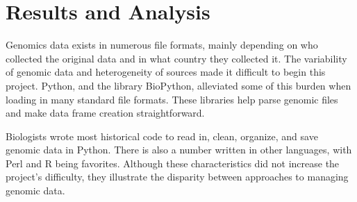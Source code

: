 \documentclass[]{article}
\begin{document}
\section{Results and Analysis}
Genomics data exists in numerous file formats, mainly depending on who collected the original data and in what country they collected it. The variability of genomic data and heterogeneity of sources made it difficult to begin this project. Python, and the library BioPython, alleviated some of this burden when loading in many standard file formats. These libraries help parse genomic files and make data frame creation straightforward.


Biologists wrote most historical code to read in, clean, organize, and save genomic data in Python. There is also a number written in other languages, with Perl and R being favorites.  Although these characteristics did not increase the project's difficulty, they illustrate the disparity between approaches to managing genomic data.
\end{document}
